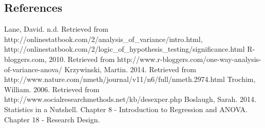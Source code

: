 \documentclass[10pt]{article}
\begin{document}
\subsection*{References}
Lane, David. n.d. Retrieved from http://onlinestatbook.com/2/analysis\_of\_variance/intro.html, http://onlinestatbook.com/2/logic\_of\_hypothesis\_testing/significance.html
R-bloggers.com, 2010. Retrieved from http://www.r-bloggers.com/one-way-analysis-of-variance-anova/
Krzywinski, Martin. 2014. Retrieved from http://www.nature.com/nmeth/journal/v11/n6/full/nmeth.2974.html
Trochim, William. 2006. Retrieved from http://www.socialresearchmethods.net/kb/desexper.php
Boslaugh, Sarah. 2014. Statistics in a Nutshell. Chapter 8 - Introduction to Regression and ANOVA. Chapter 18 - Research Design.
\end{document}
